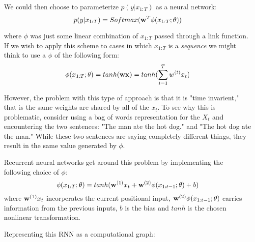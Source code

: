 \documentclass{article}
\begin{document}
We could then choose to parameterize $p(y|x_{1:T})$ as a neural network:
$$p(y|x_{1:T}) = Softmax(\bold{w}^{T} \phi(x_{1:T} ; \theta))$$

where $\phi$ was just some linear combination of $x_{1:T}$ passed through a link function. If we wish to apply this scheme to cases in which $x_{1:T}$ is a \textit{sequence} we might think to use a $\phi$ of the following form:
$$\phi(x_{1:T} ; \theta) = tanh(\bold{w}\bold{x}) = tanh(\sum_{t=1}^{T} w^{(t)}x_{t})$$

However, the problem with this type of approach is that it is "time invarient," that is the same weights are shared by all of the $x_{t}$. To see why this is problematic, consider using a bag of words representation for the $X_{t}$ and encountering the two sentences: "The man ate the hot dog." and "The hot dog ate the man." While these two sentences are saying completely different things, they result in the same value generated by $\phi$.

Recurrent neural networks get around this problem by implementing the following choice of $\phi$:
$$\phi(x_{1:T} ; \theta) = tanh(\bold{w}^{(1)} x_{t} + \bold{w}^{(2)} \phi (x_{1:t-1}; \theta) + b)$$ 
where $\bold{w}^{(1)} x_{t}$ incorperates the current positional input, $\bold{w}^{(2)} \phi (x_{1:t-1}; \theta)$ carries information from the previous inputs, $b$ is the bias and $tanh$ is the chosen nonlinear transformation.

\smallskip

Representing this RNN as a computational graph:
\end{document}

